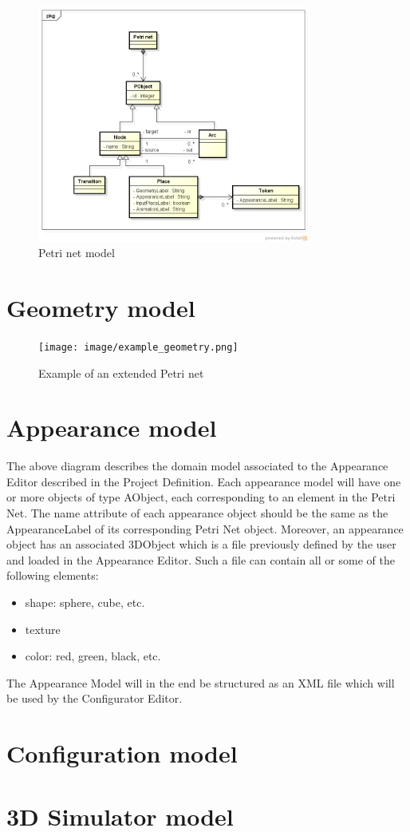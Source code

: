 \documentclass[11pt]{article}   %
\begin{document}
\begin{figure}[htp]
\begin{center}
  \includegraphics[width=0.8\textwidth]{image/petrinet.png}
  \caption{Petri net model}
  \label{fig:petrinet}
\end{center}
\end{figure}

\section{Geometry model}

\begin{figure}[htp]
\begin{center}
  \texttt{[image: image/example\_geometry.png]}
  \caption{Example of an extended Petri net}
  \label{fig:extended_petrinet}
\end{center}
\end{figure}

\section{Appearance model}

The above diagram describes the domain model associated to the Appearance Editor described in the Project Definition. 
Each appearance model will have one or more objects of type AObject, each corresponding to an element in the Petri Net. The name attribute of each appearance object should be the same as the AppearanceLabel of its corresponding Petri Net object. Moreover, an appearance object has an associated 3DObject which is a file previously defined by the user and loaded in the Appearance Editor. Such a file can contain all or some of the following elements: 
\begin{itemize}
\item shape: sphere, cube, etc.
\item texture
\item color: red, green, black, etc.
\end{itemize}

The Appearance Model will in the end be structured as an XML file which will be used by the Configurator Editor.    

\section{Configuration model}
\section{3D Simulator model}
\printindex
\end{document}

